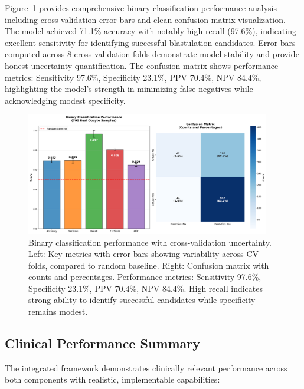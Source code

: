 Figure~\ref{fig:oocyte_metrics} provides comprehensive binary classification performance analysis including cross-validation error bars and clean confusion matrix visualization. The model achieved 71.1\% accuracy with notably high recall (97.6\%), indicating excellent sensitivity for identifying successful blastulation candidates. Error bars computed across 8 cross-validation folds demonstrate model stability and provide honest uncertainty quantification. The confusion matrix shows performance metrics: Sensitivity 97.6\%, Specificity 23.1\%, PPV 70.4\%, NPV 84.4\%, highlighting the model's strength in minimizing false negatives while acknowledging modest specificity.

\begin{figure}[H]
    \centering
    \includegraphics[width=0.95\textwidth]{figures/oocyte_classification_metrics.png}
    \caption{Binary classification performance with cross-validation uncertainty. Left: Key metrics with error bars showing variability across CV folds, compared to random baseline. Right: Confusion matrix with counts and percentages. Performance metrics: Sensitivity 97.6\%, Specificity 23.1\%, PPV 70.4\%, NPV 84.4\%. High recall indicates strong ability to identify successful candidates while specificity remains modest.}
    \label{fig:oocyte_metrics}
\end{figure}

\subsection{Clinical Performance Summary}

The integrated framework demonstrates clinically relevant performance across both components with realistic, implementable capabilities:

